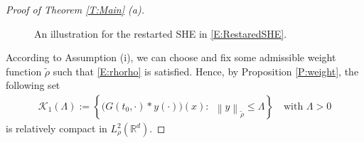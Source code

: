\documentclass[12pt]{report}
\theoremstyle{plain}
\theoremstyle{definition}
\numberwithin{equation}{section}
\newcommand{\R}{\mathbb{R}}
\newcommand{\Norm}[1]{\left\|  #1   \right\|}
\begin{document}
\begin{proof}[Proof of Theorem \ref{T:Main} (a)]
\begin{figure}[htpb]
\begin{center}
		\end{center}
		\caption{An illustration for the restarted SHE in \eqref{E:RestaredSHE}.}
		\label{F:RestartedSHE}
	\end{figure}
	
	According to Assumption (i), we can choose and fix some admissible weight function
	$\tilde{\rho}$ such that \eqref{E:rhorho} is satisfied. Hence, by Proposition \ref{P:weight},
	the following set
	\begin{align*}
	\mathscr{K}_1 (\Lambda) :=\left\{ \big(G(t_0,\cdot)*y(\cdot)\big)(x): \:\:\Norm{y}_{\tilde{\rho}} \le \Lambda \right\}
	\quad \text{with $\Lambda>0$}
	\end{align*}
	is relatively compact in $L_\rho^2(\R^d)$.
	

\end{proof}
\end{document}
